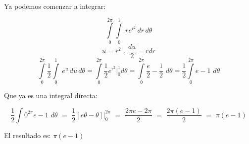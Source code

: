 \noindent Ya podemos comenzar a integrar:

    \[\displaystyle\int\limits_0^{2\pi} \!\!\int\limits_0^1 \ re^{r^2} \, dr \, d\theta \]
    \[\displaystyle u=r^2 \text{ , } \frac{du}{2}=rdr\]
    \[\displaystyle  \int\limits_0^{2\pi} \!\!\frac{1}{2}\int\limits_0^1 \ e^u \, du \, d\theta = \int\limits_0^{2\pi} \frac{1}{2}e^{r^2}\bigg|_0^1 d\theta = \int\limits_0^{2\pi} \frac{e}{2}-\frac{1}{2} \,\, d\theta = \frac{1}{2} \int\limits_0^{2\pi} e-1 \,\, d\theta\]

\noindent Que ya es una integral directa:

    \[\displaystyle \frac{1}{2}\int\limits0^{2\pi} e-1 \,\, d\theta \,\, = \,\, \frac{1}{2}[e\theta - \theta]\bigg|_0^{2\pi} \,\, = \,\, \frac{2\pi e - 2\pi}{2} \,\, = \,\, \frac{2\pi(e-1)}{2} \,\, = \,\, \pi(e-1)\]

\noindent El resultado es: $\pi(e-1)$
